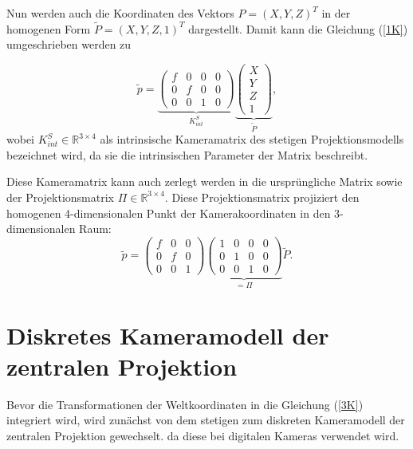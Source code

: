 {Nun werden auch die Koordinaten des Vektors $P=(X, Y, Z)^T$ 
in der homogenen Form $\tilde P =( X, Y, Z,1)^T$ dargestellt. 
Damit kann die Gleichung (\ref{1K}) umgeschrieben werden zu

\begin{equation} \nonumber
    \tilde p =
    \underbrace{
        \left ( 
        \begin{array}{cccc}
            f & 0 & 0 & 0\\ 
            0 & f & 0 & 0 \\ 
            0 & 0 & 1 & 0
        \end{array}
        \right )}_{K_{int}^S}
    \underbrace{
        \left (
        \begin{array}{c}
            X \\ Y \\ Z \\1
        \end{array}
        \right )}_{ \tilde P},
\end{equation}
wobei $K_{int}^S \in \mathbb{R}^{3 \times 4}$ als intrinsische Kameramatrix des stetigen Projektions\-modells bezeichnet wird, 
da sie die intrinsischen Parameter der Matrix beschreibt. 

Diese Kameramatrix kann auch zerlegt werden in die ursprüngliche Matrix 
sowie der Projektionsmatrix $\Pi \in \mathbb{R}^{3 \times 4}$.
Diese Projektionsmatrix projiziert den homogenen 4-dimensionalen Punkt der Kamerakoordinaten in den 3-dimensionalen Raum:
\begin{equation} \label{3K}
    \tilde p =
    \left ( 
    \begin{array}{ccc}
        f & 0 & 0 \\ 
        0 & f & 0 \\ 
        0 & 0 & 1
    \end{array}
    \right )
    \underbrace{
        \left ( 
        \begin{array}{cccc}
            1 & 0 & 0 & 0\\ 
            0 & 1 & 0 & 0 \\ 
            0 & 0 & 1 & 0
        \end{array}
        \right )}_{=\Pi}
    \tilde P.
\end{equation}

\section{Diskretes Kameramodell der zentralen Projektion} \label{DK}
Bevor die Transformationen der Weltkoordinaten in die Gleichung (\ref{3K}) integriert wird, 
wird zunächst von dem stetigen zum diskreten Kamera\-modell der zentralen Projektion gewechselt. 
da diese bei digitalen Kameras verwendet wird.

}
